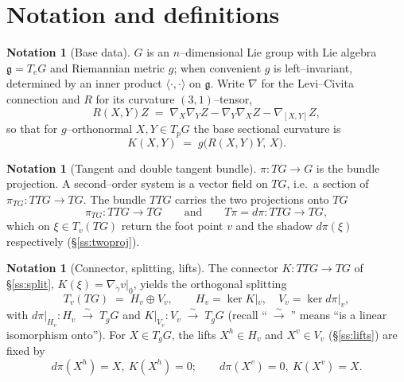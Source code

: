 \documentclass[11pt]{article}
\theoremstyle{definition}
\newtheorem{notation}[definition]{Notation}
\theoremstyle{plain}
\newcommand{\g}{\mathfrak{g}}
\newcommand{\Sec}{K}
\newcommand{\dpi}{d\pi}
\newcommand{\hor}[1]{#1^{h}}
\newcommand{\ver}[1]{#1^{v}}
\newcommand{\inner}[2]{\langle #1, #2\rangle}
\newcommand{\TG}{TG}
\newcommand{\TTG}{TTG}
\newcommand{\iso}{\;\xrightarrow{\;\sim\;}\;}
\begin{document}
\section{Notation and definitions}\label{sec:notation}

\begin{notation}[Base data]\label{not:base}
$G$ is an $n$--dimensional Lie group with Lie algebra $\g=T_eG$ and Riemannian metric $g$;
when convenient $g$ is left--invariant, determined by an inner product
$\inner{\cdot}{\cdot}$ on $\g$. Write $\nabla$ for the Levi--Civita connection and $R$ for
its curvature $(3,1)$--tensor,
\begin{equation}\label{eq:Rconv}
  R(X,Y)Z \;=\; \nabla_X\nabla_Y Z-\nabla_Y\nabla_X Z-\nabla_{[X,Y]}Z ,
\end{equation}
so that for $g$--orthonormal $X,Y\in T_pG$ the base sectional curvature is
\begin{equation}\label{eq:Kbase}
  \Sec(X,Y) \;=\; g\bigl(R(X,Y)Y,\,X\bigr).
\end{equation}
\end{notation}

\begin{notation}[Tangent and double tangent bundle]\label{not:double}
$\pi:\TG\to G$ is the bundle projection. A second--order system is a vector field on $\TG$,
i.e.\ a section of $\pi_{\TG}:\TTG\to\TG$. The bundle $\TTG$ carries the two projections
onto $\TG$
\begin{equation}\label{eq:twoproj}
  \pi_{\TG}:\TTG\longrightarrow \TG
  \qquad\text{and}\qquad
  T\pi=\dpi:\TTG\longrightarrow \TG ,
\end{equation}
which on $\xi\in T_v(\TG)$ return the foot point $v$ and the shadow $\dpi(\xi)$
respectively (\S\ref{ss:twoproj}).
\end{notation}

\begin{notation}[Connector, splitting, lifts]\label{not:split}
The connector $K:\TTG\to\TG$ of \S\ref{ss:split}, $K(\xi)=\nabla_{\dot\gamma}v|_{0}$,
yields the orthogonal splitting
\begin{equation}\label{eq:split}
  T_v(\TG) \;=\; H_v\oplus V_v,
  \qquad
  H_v=\ker K|_v,\quad V_v=\ker \dpi|_v,
\end{equation}
with $\dpi|_{H_v}:H_v\iso T_gG$ and $K|_{V_v}:V_v\iso T_gG$
(recall ``$\iso$'' means ``is a linear isomorphism onto''). For $X\in T_gG$, the lifts
$\hor{X}\in H_v$ and $\ver{X}\in V_v$ (\S\ref{ss:lifts}) are fixed by
\[
  \dpi(\hor{X})=X,\ K(\hor{X})=0;
  \qquad
  \dpi(\ver{X})=0,\ K(\ver{X})=X .
\]
\end{notation}
\end{document}

